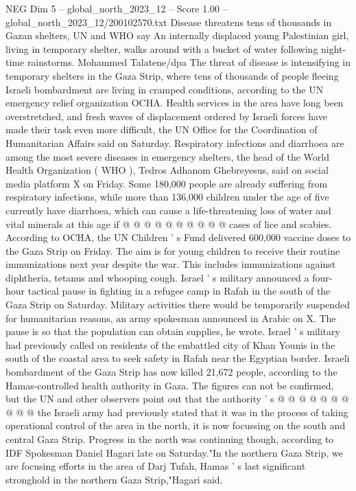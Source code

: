 \begin{textsample}{NEG Dim 5 – global\_north\_2023\_12 – Score 1.00 – global\_north\_2023\_12/200102570.txt}  \label{ex:f5_neg_117}
Disease threatens tens of thousands in Gazan shelters, UN and WHO say An internally displaced young Palestinian girl, living in temporary shelter, walks around with a bucket of water following night-time rainstorms.
Mohammed Talatene/dpa The threat of disease is intensifying in temporary shelters in the Gaza Strip, where tens of thousands of people fleeing Israeli bombardment are living in cramped conditions, according to the UN emergency relief organization OCHA.
Health services in the area have long been overstretched, and fresh waves of displacement ordered by Israeli forces have made their task even more difficult, the UN Office for the Coordination of Humanitarian Affairs said on Saturday.
Respiratory infections and diarrhoea are among the most severe diseases in emergency shelters, the head of the World Health Organization ( WHO ), Tedros Adhanom Ghebreyesus, said on social media platform X on Friday.
Some 180,000 people are already suffering from respiratory infections, while more than 136,000 children under the age of five currently have diarrhoea, which can cause a life-threatening loss of water and vital minerals at this age if @ @ @ @ @ @ @ @ @ @ cases of lice and scabies.
According to OCHA, the UN Children ' s Fund delivered 600,000 vaccine doses to the Gaza Strip on Friday.
The aim is for young children to receive their routine immunizations next year despite the war.
This includes immunizations against diphtheria, tetanus and whooping cough.
Israel ' s military announced a four-hour tactical pause in fighting in a refugee camp in Rafah in the south of the Gaza Strip on Saturday.
Military activities there would be temporarily suspended for humanitarian reasons, an army spokesman announced in Arabic on X.
The pause is so that the population can obtain supplies, he wrote.
Israel ' s military had previously called on residents of the embattled city of Khan Younis in the south of the coastal area to seek safety in Rafah near the Egyptian border.
Israeli bombardment of the Gaza Strip has now killed 21,672 people, according to the Hamas-controlled health authority in Gaza.
The figures can not be confirmed, but the UN and other observers point out that the authority ' s @ @ @ @ @ @ @ @ @ @ the Israeli army had previously stated that it was in the process of taking operational control of the area in the north, it is now focussing on the south and central Gaza Strip.
Progress in the north was continuing though, according to IDF Spokesman Daniel Hagari late on Saturday."In the northern Gaza Strip, we are focusing efforts in the area of Darj Tufah, Hamas ' s last significant stronghold in the northern Gaza Strip,"Hagari said.

\end{textsample}
